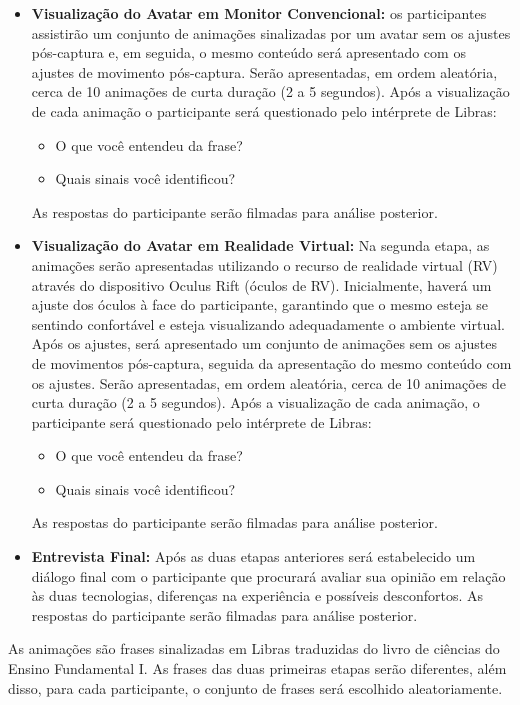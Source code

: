 \documentclass[a4paper,11pt,titlepage,singlespacing]{article}
\begin{document}
\begin{itemize}
\item \textbf{Visualização do Avatar em Monitor Convencional:} os participantes assistirão um conjunto de animações sinalizadas por um avatar sem os ajustes pós-captura e, em seguida, o mesmo conteúdo será apresentado com os ajustes de movimento pós-captura. Serão apresentadas, em ordem aleatória, cerca de 10 animações de curta duração (2 a 5 segundos). Após a visualização de cada animação o participante será questionado pelo intérprete de Libras:
\begin{itemize}
\item O que você entendeu da frase?
\item Quais sinais você identificou?
\end{itemize}
As respostas do participante serão filmadas para análise posterior.

\item \textbf{Visualização do Avatar em Realidade Virtual:} 
Na segunda etapa, as animações serão apresentadas utilizando o recurso de realidade virtual (RV) através do dispositivo Oculus Rift (óculos de RV). 
Inicialmente, haverá um ajuste dos óculos à face do participante, garantindo que o mesmo esteja se sentindo confortável e esteja visualizando adequadamente o ambiente virtual. Após os ajustes, será apresentado um conjunto de animações sem os ajustes de movimentos pós-captura, seguida da apresentação do mesmo conteúdo com os ajustes. Serão apresentadas, em ordem aleatória, cerca de 10 animações de curta duração (2 a 5 segundos).
Após a visualização de cada animação, o participante será questionado pelo intérprete de Libras:
\begin{itemize}
\item O que você entendeu da frase?
\item Quais sinais você identificou?
\end{itemize}
As respostas do participante serão filmadas para análise posterior.

\item \textbf{Entrevista Final:} Após as duas etapas anteriores será estabelecido um diálogo final com o participante que procurará avaliar sua opinião em relação às duas tecnologias, diferenças na experiência e possíveis desconfortos. As respostas do participante serão filmadas para análise posterior.

\end{itemize}

As animações são frases sinalizadas em Libras traduzidas do livro de ciências do Ensino Fundamental I. As frases das duas primeiras etapas serão diferentes, além disso, para cada participante, o conjunto de frases será escolhido aleatoriamente.
\end{document}
